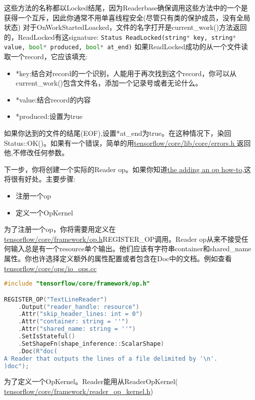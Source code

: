 这些方法的名称都以Locked结尾，因为Readerbase确保调用这些方法中的一个是获得一个互斥，因此你通常不用单喜线程安全(尽管只有类的保护成员，没有全局状态)
对于OnWorkStartedLoacked，文件的名字打开是current\_work()方法返回的，ReadLocked有这signature:
\lstinline[language=Python]{Status ReadLocked(string* key, string* value, bool* produced, bool* at_end)}
如果ReadLocked成功的从一个文件读取一个record，它应该填充:
\begin{itemize}
	\item *key:结合对record的一个识别，人能用于再次找到这个record，你可以从current\_work()包含文件名，添加一个记录号或者无论什么。
	\item *value:结合record的内容
	\item *produced:设置为true
\end{itemize}
如果你达到的文件的结尾(EOF),设置*at\_end为true。在这种情况下，染回Status::OK()。如果有一个错误，简单的用\href{https://www.github.com/tensorflow/tensorflow/blob/r1.4/tensorflow/core/lib/core/errors.h}{tensorflow/core/lib/core/errors.h }返回他,不修改任何参数。

下一步，你将创建一个实际的Reader op。如果你知道\href{https://www.tensorflow.org/extend/adding_an_op}{the adding an op how-to},这将很有好处。主要步骤:
\begin{itemize}
	\item 注册一个op 
	\item 定义一个OpKernel
\end{itemize}
为了注册一个op，你将需要用定义在\href{https://www.github.com/tensorflow/tensorflow/blob/r1.4/tensorflow/core/framework/op.h}{ tensorflow/core/framework/op.h}REGISTER\_OP调用。Reader op从来不接受任何输入总是有一个resource单个输出。他们应该有字符串container和shared\_name属性。你也许选择定义额外的属性配置或者包含在Doc中的文档。例如查看\href{https://www.github.com/tensorflow/tensorflow/blob/r1.4/tensorflow/core/ops/io_ops.cc}{tensorflow/core/ops/io\_ops.cc}
\begin{lstlisting}[language=C++]
#include "tensorflow/core/framework/op.h"

REGISTER_OP("TextLineReader")
    .Output("reader_handle: resource")
    .Attr("skip_header_lines: int = 0")
    .Attr("container: string = ''")
    .Attr("shared_name: string = ''")
    .SetIsStateful()
    .SetShapeFn(shape_inference::ScalarShape)
    .Doc(R"doc(
A Reader that outputs the lines of a file delimited by '\n'.
)doc");
\end{lstlisting}
为了定义一个OpKernel。Reader能用从ReaderOpKernel(
\href{https://www.github.com/tensorflow/tensorflow/blob/r1.4/tensorflow/core/framework/reader_op_kernel.h}{tensorflow/core/framework/reader\_op\_kernel.h})

